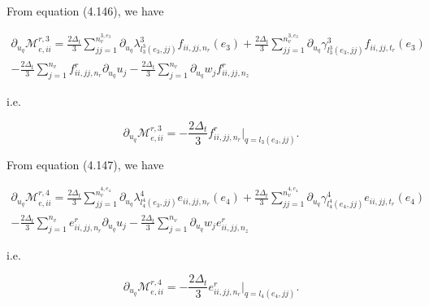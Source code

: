 \documentclass{article}
\begin{document}
From equation (4.146), we have

\begin{equation}
\begin{array}{l} \partial_{u_q} \mathcal{M}_{e,ii}^{r,3} = \frac{2\Delta_t}{3} \sum_{jj=1}^{n_v^{3,e_3}} \partial_{u_q} \lambda_{l_3^3(e_3,jj)}^3 f_{ii,jj,n_r}(e_3) + \frac{2\Delta_t}{3} \sum_{jj=1}^{n_v^{3,e_3}} \partial_{u_q} \gamma_{l_3^3(e_3,jj)}^3 f_{ii,jj,t_r}(e_3) \\ - \frac{2\Delta_t}{3} \sum_{j=1}^{n_v} f_{ii,jj,n_r}^r \partial_{u_q} u_j - \frac{2\Delta_t}{3} \sum_{j=1}^{n_v} \partial_{u_q} w_j f_{ii,jj,n_z}^r \end{array} \tag{4.169}
\end{equation}

i.e.

\begin{equation}
\partial_{u_q} \mathcal{M}_{e,ii}^{r,3} = -\frac{2\Delta_t}{3} f_{ii,jj,n_r}^r \big|_{q=l_3(e_3,jj)}. \tag{4.170}
\end{equation}

From equation (4.147), we have

\begin{equation}
\begin{array}{l} \partial_{u_q} \mathcal{M}_{e,ii}^{r,4} = \frac{2\Delta_t}{3} \sum_{jj=1}^{n_v^{4,e_4}} \partial_{u_q} \lambda_{l_4^4(e_3,jj)}^4 e_{ii,jj,n_r}(e_4) + \frac{2\Delta_t}{3} \sum_{jj=1}^{n_v^{4,e_4}} \partial_{u_q} \gamma_{l_4^4(e_4,jj)}^4 e_{ii,jj,t_r}(e_4) \\ - \frac{2\Delta_t}{3} \sum_{j=1}^{n_v} e_{ii,jj,n_r}^r \partial_{u_q} u_j - \frac{2\Delta_t}{3} \sum_{j=1}^{n_v} \partial_{u_q} w_j e_{ii,jj,n_z}^r \end{array} \tag{4.171}
\end{equation}

i.e.

\begin{equation}
\partial_{u_q} \mathcal{M}_{e,ii}^{r,4} = -\frac{2\Delta_t}{3} e_{ii,jj,n_r}^r \big|_{q=l_4(e_4,jj)}. \tag{4.172}
\end{equation}

\newcommand{\dt}{\Delta_t}
\newcommand{\ca}{Ca}
\newcommand{\re}{Re}
\newcommand{\st}{St}
\newcommand{\be}{Be}
\newcommand{\es}{Es}
\newcommand{\cg}{Cg}
\newcommand{\cs}{Cs}
\newcommand{\omeg}{\partial}  %
\newcommand{\vphi}{\phi}
\newcommand{\vpsi}{\psi}
\newcommand{\sigt}{\sigma}
\newcommand{\eps}{\varepsilon}
\newcommand{\gaml}{\gamma}
\newcommand{\lam}{\lambda}
\newcommand{\mcal}{\mathcal}
\newcommand{\bfl}{\bm{l}}
\newcommand{\bfn}{\bm{n}}
\newcommand{\bft}{\bm{t}}
\newcommand{\bfP}{\bm{P}}
\newcommand{\bfu}{\bm{u}}
\newcommand{\bfv}{\bm{v}}
\newcommand{\bfc}{\bm{c}}
\newcommand{\bfg}{\bm{g}}
\newcommand{\bfhat}[1]{\hat{\bm{#1}}}
\newcommand{\nablas}{\nabla^s}
\newcommand{\nablasdot}{\nabla^s \cdot}
\newcommand{\pa}{\partial}
\newcommand{\tf}{\tilde}
\newcommand{\ov}{\overline}
\newcommand{\un}{\underline}
\newcommand{\del}{\partial}
\end{document}
